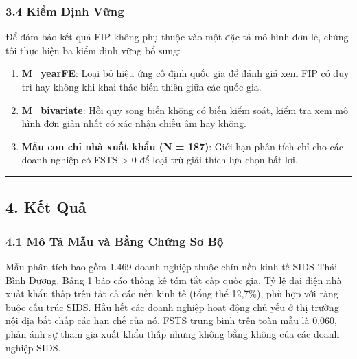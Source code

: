 \documentclass[12pt,a4paper]{article}
\providecommand{\tightlist}{\setlength{\itemsep}{0pt}\setlength{\parskip}{0pt}}
\begin{document}
\hypertarget{34-kiux1ec3m-ux111ux1ecbnh-vux1eefng}{%
\subsubsection{3.4 Kiểm Định
Vững}\label{34-kiux1ec3m-ux111ux1ecbnh-vux1eefng}}

Để đảm bảo kết quả FIP không phụ thuộc vào một đặc tả mô hình đơn lẻ,
chúng tôi thực hiện ba kiểm định vững bổ sung:

\begin{enumerate}
\def\labelenumi{\arabic{enumi}.}
\tightlist
\item
  \textbf{M\_yearFE}: Loại bỏ hiệu ứng cố định quốc gia để đánh giá xem
  FIP có duy trì hay không khi khai thác biến thiên giữa các quốc gia.
\item
  \textbf{M\_bivariate}: Hồi quy song biến không có biến kiểm soát, kiểm
  tra xem mô hình đơn giản nhất có xác nhận chiều âm hay không.
\item
  \textbf{Mẫu con chỉ nhà xuất khẩu (N = 187)}: Giới hạn phân tích chỉ
  cho các doanh nghiệp có FSTS \textgreater{} 0 để loại trừ giải thích
  lựa chọn bất lợi.
\end{enumerate}

\begin{center}\rule{0.5\linewidth}{0.5pt}\end{center}

\hypertarget{4-kux1ebft-quux1ea3}{%
\subsection{4. Kết Quả}\label{4-kux1ebft-quux1ea3}}

\hypertarget{41-muxf4-tux1ea3-mux1eabu-vuxe0-bux1eb1ng-chux1ee9ng-sux1a1-bux1ed9}{%
\subsubsection{4.1 Mô Tả Mẫu và Bằng Chứng Sơ
Bộ}\label{41-muxf4-tux1ea3-mux1eabu-vuxe0-bux1eb1ng-chux1ee9ng-sux1a1-bux1ed9}}

Mẫu phân tích bao gồm 1.469 doanh nghiệp thuộc chín nền kinh tế SIDS
Thái Bình Dương. Bảng 1 báo cáo thống kê tóm tắt cấp quốc gia. Tỷ lệ đại
diện nhà xuất khẩu thấp trên tất cả các nền kinh tế (tổng thể 12,7\%),
phù hợp với ràng buộc cấu trúc SIDS. Hầu hết các doanh nghiệp hoạt động
chủ yếu ở thị trường nội địa bất chấp các hạn chế của nó. FSTS trung
bình trên toàn mẫu là 0,060, phản ánh sự tham gia xuất khẩu thấp nhưng
không bằng không của các doanh nghiệp SIDS.
\end{document}
